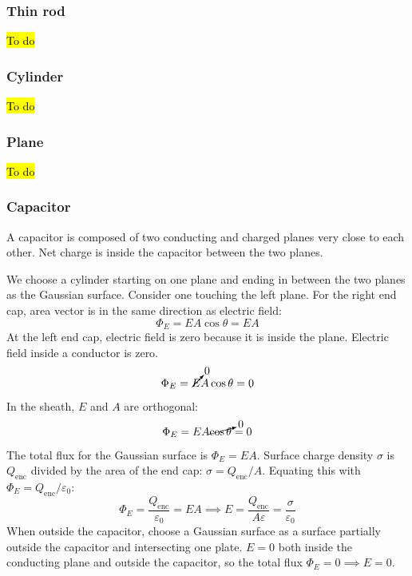 \documentclass{article}
\begin{document}
\subsubsection{Thin rod}
\hl{To do}

\subsubsection{Cylinder}
\hl{To do}

\subsubsection{Plane}
\hl{To do}

\subsubsection{Capacitor}

A capacitor is composed of two conducting and charged planes very close to each other. Net charge is inside the capacitor between the two planes.

We choose a cylinder starting on one plane and ending in between the two planes as the Gaussian surface. Consider one touching the left plane. For the right end cap, area vector is in the same direction as electric field:
\begin{equation*}
    \Phi_E=EA\cos\theta=EA
\end{equation*}
At the left end cap, electric field is zero because it is inside the plane. Electric field inside a conductor is zero.
\begin{equation*}
    \Phi_E=\cancelto0EA\cos\theta=0
\end{equation*}
In the sheath, $E$ and $A$ are orthogonal:
\begin{equation*}
	\Phi_E=EA\cancelto0{\cos\theta}=0
\end{equation*}
The total flux for the Gaussian surface is $\Phi_E=EA$. Surface charge density $\sigma$ is $Q_\text{enc}$ divided by the area of the end cap: $\sigma=Q_\text{enc}/A$. Equating this with $\Phi_E=Q_\text{enc}/\varepsilon_0$:
\begin{equation*}
	\Phi_E=\frac{Q_\text{enc}}{\varepsilon_0}=EA
	\implies
	E=\frac{Q_\text{enc}}{A\varepsilon}=\boxed{\frac{\sigma}{\varepsilon_0}}
\end{equation*}
When outside the capacitor, choose a Gaussian surface as a surface partially outside the capacitor and intersecting one plate. $E=0$ both inside the conducting plane and outside the capacitor, so the total flux $\Phi_E=0\implies E=0$.
\end{document}

